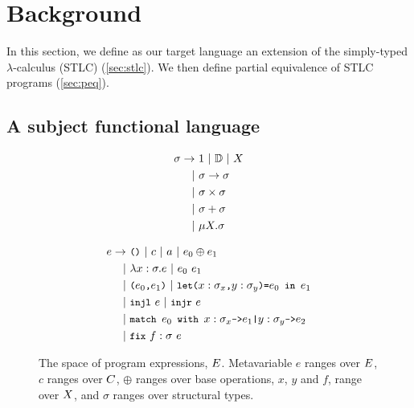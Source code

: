 \section{Background}
\label{sec:background}
%
In this section, we define as our target language an extension of the
simply-typed $\lambda$-calculus (STLC) (\autoref{sec:stlc}).
%
We then define partial equivalence of STLC programs
(\autoref{sec:peq}).

\subsection{A subject functional language}
\label{sec:stlc}
\begin{figure}[t]
  \begin{minipage}{0.36\linewidth}
    \begin{align*} %
      \sigma \rightarrow &\ \unitty\ |\ \basety\ |\ X \\
      | &\ \sigma \rightarrow \sigma \\
      | &\ \sigma \times \sigma \\
      | &\ \sigma + \sigma \\
      | &\ \mu X. \sigma
    \end{align*}
    \caption{The space of structural types, $\types$.
      Metavariable $\sigma$ ranges over $\types$ and $X$ ranges over
      least-fixed point variables.} %
    \label{fig:types}
  \end{minipage}
  \qquad
  \begin{minipage}{0.55\linewidth}
    \begin{align*}
      e \rightarrow &\ \unit\ 
                      |\ c\
                      |\ a\ 
                      |\ e_0 \oplus e_1 \\
      | &\ \abs{ x }{ \sigma }{ e } \
          | \ e_0\ e_1 \\
      | &\ \pair{e_0}{e_1} \
          |\ \letexp{x}{\sigma_x }{y}{\sigma_y }{e_0}{e_1} \\
      | &\ \injl\ e\ |\ \injr\ e\ \\
      | &\ \matchexp{e_0}{x}{\sigma_x}{e_1}{y}{\sigma_y}{e_2} \\
      | &\ \fix{f}{\sigma}{e}
    \end{align*}
    \caption{The space of program expressions, $E$.
      Metavariable $e$ ranges over $E$, %
      $c$ ranges over $C$, %
      $\oplus$ ranges over base operations, %
      $x$, $y$ and $f$, range over $X$, and %
      $\sigma$ ranges over structural types. } %
    \label{fig:exprs}
  \end{minipage}
  \qquad
\end{figure}

